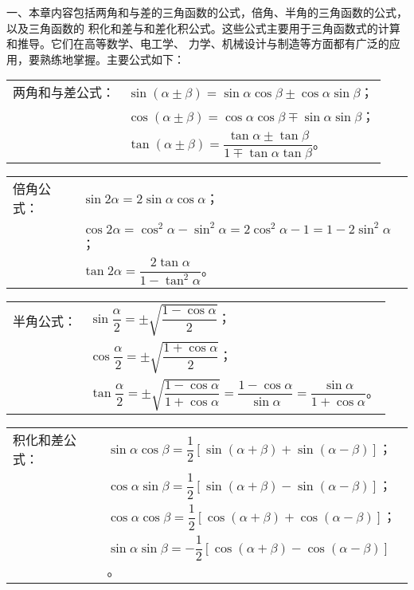 \xiaojie

一、本章内容包括两角和与差的三角函数的公式，倍角、半角的三角函数的公式，以及三角函数的
积化和差与和差化积公式。这些公式主要用于三角函数式的计算和推导。它们在高等数学、电工学、
力学、机械设计与制造等方面都有广泛的应用，要熟练地掌握。主要公式如下：

\begin{tabular}[t]{@{}p{10em}@{}l}
    两角和与差公式：& $\sin(\alpha \pm \beta) = \sin\alpha \cos\beta \pm \cos\alpha \sin\beta$；\\
    & $\cos(\alpha \pm \beta) = \cos\alpha \cos\beta \mp \sin\alpha \sin\beta$；\\
    & $\tan(\alpha \pm \beta) = \dfrac{\tan\alpha \pm \tan\beta}{1 \mp \tan\alpha \tan\beta}$。
\end{tabular}

\begin{tabular}[t]{@{}p{10em}@{}l}
    倍角公式：& $\sin2\alpha = 2\sin\alpha \cos\alpha$；\\
    & $\cos2\alpha = \cos^2\alpha - \sin^2\alpha = 2\cos^2\alpha - 1 = 1 - 2\sin^2\alpha$；\\
    & $\tan2\alpha = \dfrac{2\tan\alpha}{1 - \tan^2\alpha}$。
\end{tabular}

\renewcommand\arraystretch{2}
\begin{tabular}[t]{@{}p{10em}@{}l}
    半角公式：& $\sin\dfrac{\alpha}{2} = \pm\sqrt{\dfrac{1 - \cos\alpha}{2}}$；\\
    & $\cos\dfrac{\alpha}{2} = \pm\sqrt{\dfrac{1 + \cos\alpha}{2}}$；\\
    & $\tan\dfrac{\alpha}{2} = \pm\sqrt{\dfrac{1 - \cos\alpha}{1 + \cos\alpha}} = \dfrac{1 - \cos\alpha}{\sin\alpha} = \dfrac{\sin\alpha}{1 + \cos\alpha}$。
\end{tabular}

\renewcommand\arraystretch{1.8}
\begin{tabular}[t]{@{}p{10em}@{}l}
    积化和差公式：& $\sin\alpha \cos\beta = \dfrac{1}{2} [\sin(\alpha + \beta) + \sin(\alpha - \beta)]$；\\
    & $\cos\alpha \sin\beta = \dfrac{1}{2} [\sin(\alpha + \beta) - \sin(\alpha - \beta)]$；\\
    & $\cos\alpha \cos\beta = \dfrac{1}{2} [\cos(\alpha + \beta) + \cos(\alpha - \beta)]$；\\
    & $\sin\alpha \sin\beta = -\dfrac{1}{2} [\cos(\alpha + \beta) - \cos(\alpha - \beta)]$。
\end{tabular}

